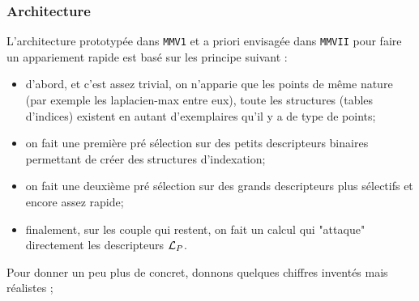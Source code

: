 \subsubsection{Architecture}

L'architecture prototyp\'ee dans {\tt MMV1} et a priori envisag\'ee dans {\tt MMVII}
pour faire un appariement rapide est bas\'e sur les principe suivant :

\begin{itemize}
    \item d'abord, et c'est assez trivial, on n'apparie que les points de m\^eme nature
          (par exemple les laplacien-max entre eux), toute les structures (tables d'indices)
          existent en autant d'exemplaires qu'il y a de type de points; 

    \item on fait une premi\`ere pr\'e s\'election sur des  petits descripteurs binaires permettant
          de cr\'eer des structures d'indexation;

    \item on fait une deuxi\`eme pr\'e s\'election sur des  grands descripteurs  plus s\'electifs
          et encore assez rapide;
          
    \item finalement, sur les couple qui restent, on fait un calcul qui "attaque" directement les descripteurs
          ${\mathcal L_P}$.
\end{itemize}

Pour donner un peu plus de concret, donnons quelques chiffres invent\'es mais r\'ealistes ;

